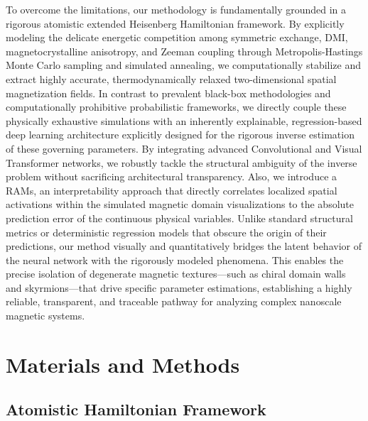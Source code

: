 \documentclass[final,5p,times,twocolumn]{elsarticle}
\begin{document}
To overcome the limitations, our methodology is fundamentally grounded in a rigorous atomistic extended Heisenberg Hamiltonian framework. By explicitly modeling the delicate energetic competition among symmetric exchange, DMI, magnetocrystalline anisotropy, and Zeeman coupling through Metropolis-Hastings Monte Carlo sampling and simulated annealing, we computationally stabilize and extract highly accurate, thermodynamically relaxed two-dimensional spatial magnetization fields. In contrast to prevalent black-box methodologies and computationally prohibitive probabilistic frameworks, we directly couple these physically exhaustive simulations with an inherently explainable, regression-based deep learning architecture explicitly designed for the rigorous inverse estimation of these governing parameters. By integrating advanced Convolutional and Visual Transformer networks, we robustly tackle the structural ambiguity of the inverse problem without sacrificing architectural transparency. Also, we introduce a RAMs, an interpretability approach that directly correlates localized spatial activations within the simulated magnetic domain visualizations to the absolute prediction error of the continuous physical variables. Unlike standard structural metrics or deterministic regression models that obscure the origin of their predictions, our method visually and quantitatively bridges the latent behavior of the neural network with the rigorously modeled phenomena. This enables the precise isolation of degenerate magnetic textures—such as chiral domain walls and skyrmions—that drive specific parameter estimations, establishing a highly reliable, transparent, and traceable pathway for analyzing complex nanoscale magnetic systems.



\section{Materials and Methods}\label{sec:materials}

\subsection{Atomistic Hamiltonian Framework}\label{sec:hamiltonian}
\end{document}
